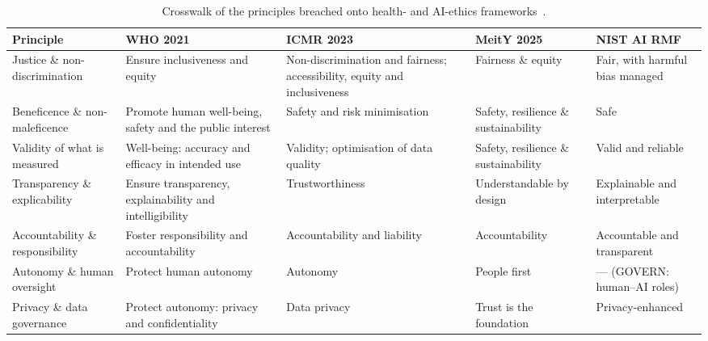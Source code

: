 \begin{table}[t]
\centering
\caption{Crosswalk of the principles breached onto health- and AI-ethics frameworks~\cite{who2021,icmr2023,meity2025,nist2023}.}
\label{tab:principles}
\footnotesize
\renewcommand{\arraystretch}{1.12}
\begin{tabular}{@{}>{\raggedright\arraybackslash}p{3.1cm} >{\raggedright\arraybackslash}p{3.4cm} >{\raggedright\arraybackslash}p{3.6cm} >{\raggedright\arraybackslash}p{2.9cm} >{\raggedright\arraybackslash}p{3.2cm}@{}}
\toprule
Principle & WHO 2021 & ICMR 2023 & MeitY 2025 & NIST AI RMF \\
\midrule
Justice \& non-discrimination & Ensure inclusiveness and equity & Non-discrimination and fairness; accessibility, equity and inclusiveness & Fairness \& equity & Fair, with harmful bias managed \\
Beneficence \& non-maleficence & Promote human well-being, safety and the public interest & Safety and risk minimisation & Safety, resilience \& sustainability & Safe \\
Validity of what is measured & Well-being: accuracy and efficacy in intended use & Validity; optimisation of data quality & Safety, resilience \& sustainability & Valid and reliable \\
Transparency \& explicability & Ensure transparency, explainability and intelligibility & Trustworthiness & Understandable by design & Explainable and interpretable \\
Accountability \& responsibility & Foster responsibility and accountability & Accountability and liability & Accountability & Accountable and transparent \\
Autonomy \& human oversight & Protect human autonomy & Autonomy & People first & — (GOVERN: human--AI roles) \\
Privacy \& data governance & Protect autonomy: privacy and confidentiality & Data privacy & Trust is the foundation & Privacy-enhanced \\
\bottomrule
\end{tabular}
\end{table}
